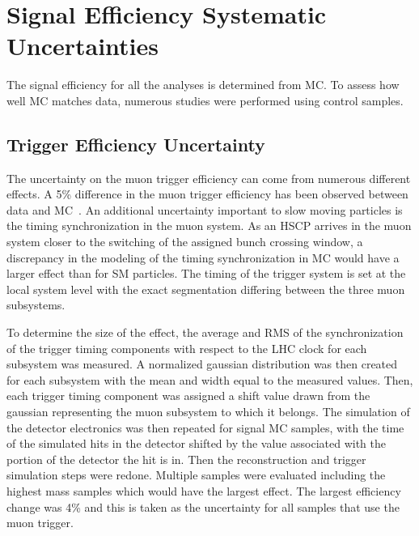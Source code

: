 \section{Signal Efficiency Systematic Uncertainties \label{sec:SystUnc}}

The signal efficiency for all the analyses is determined from MC. To assess how well MC matches data, numerous studies were performed using control samples.

\subsection{Trigger Efficiency Uncertainty}


The uncertainty on the muon trigger efficiency can come from numerous different effects. 
A 5\% difference in the muon trigger efficiency has been observed between data and MC~\cite{2012JInst...7P0002T}.
An additional uncertainty important to slow moving particles is the timing synchronization in the muon system. As an HSCP arrives in the muon system
closer to the switching of the assigned bunch crossing window, a discrepancy in the modeling of the timing synchronization in MC would have a larger effect than for SM particles.
The timing of the trigger system is set at the local system level with the
exact segmentation differing between the three muon subsystems.

To determine the size of the effect, the average and RMS of the synchronization of the trigger timing components with respect to the LHC clock
for each subsystem was measured.
A normalized gaussian distribution was then created for each subsystem with the mean and width equal to the measured values.
Then, each trigger timing component was
assigned a shift value drawn from the gaussian representing the muon subsystem to which it belongs. The simulation of the detector electronics was then repeated
for signal MC samples, with
the time of the simulated hits in the detector shifted by the value associated with the portion of the detector the hit is in. Then the reconstruction and trigger
simulation steps were redone. 
Multiple samples were evaluated including the highest mass samples which would have the largest effect.
The largest efficiency change was 4\% and this is taken as the uncertainty for all samples that use the muon trigger.


